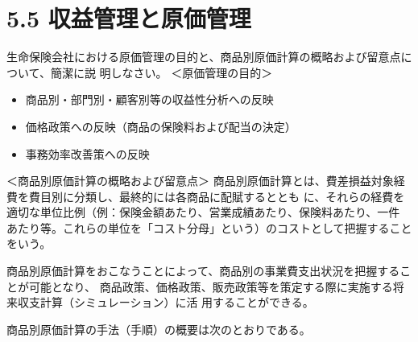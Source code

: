 \documentclass[report,gutter=10mm,fore-edge=10mm,uplatex,dvipdfmx]{jlreq}
\begin{document}
\section{5.5 収益管理と原価管理}
\vspace{1zh}
生命保険会社における原価管理の目的と、商品別原価計算の概略および留意点について、簡潔に説
明しなさい。
\answer{}
＜原価管理の目的＞
\begin{itemize}
\item[] 商品別・部門別・顧客別等の収益性分析への反映
\item[] 価格政策への反映（商品の保険料および配当の決定）
\item[] 事務効率改善策への反映
\end{itemize}

＜商品別原価計算の概略および留意点＞
商品別原価計算とは、費差損益対象経費を費目別に分類し、最終的には各商品に配賦するととも
に、それらの経費を適切な単位比例（例：保険金額あたり、営業成績あたり、保険料あたり、一件
あたり等。これらの単位を「コスト分母」という）のコストとして把握することをいう。

商品別原価計算をおこなうことによって、商品別の事業費支出状況を把握することが可能となり、
商品政策、価格政策、販売政策等を策定する際に実施する将来収支計算（シミュレーション）に活
用することができる。

商品別原価計算の手法（手順）の概要は次のとおりである。
\end{document}
